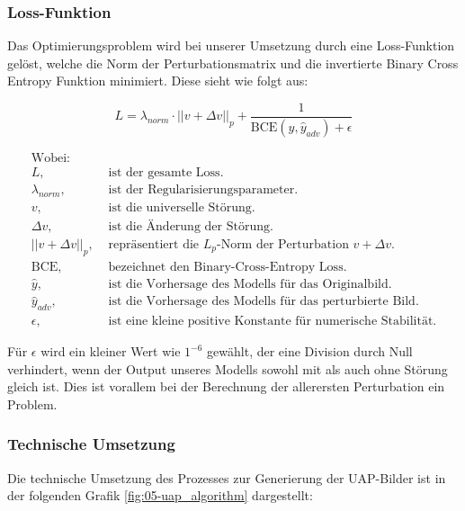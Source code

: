 \subsubsection{Loss-Funktion}
Das Optimierungsproblem wird bei unserer Umsetzung durch eine Loss-Funktion gelöst, welche die Norm der Perturbationsmatrix und die invertierte Binary Cross Entropy Funktion minimiert. Diese sieht wie folgt aus:

\begin{equation}
    L = \lambda_{norm} \cdot ||v + \Delta v||_p + \frac{1}{\text{BCE}(\hat{y}, \hat{y}_{adv}) + \epsilon}
\label{Loss}
\end{equation}

\begin{align*}
\text{Wobei:}&\\
L, &\text{ ist der gesamte Loss.} \\
\lambda_{norm}, &\text{ ist der Regularisierungsparameter.} \\
v, &\text{ ist die universelle Störung.} \\
\Delta v, &\text{ ist die Änderung der Störung.} \\
||v + \Delta v||_p, &\text{ repräsentiert die } L_p \text{-Norm der Perturbation } v + \Delta v. \\
\text{BCE}, &\text{ bezeichnet den Binary-Cross-Entropy Loss.} \\
\hat{y}, &\text{ ist die Vorhersage des Modells für das Originalbild.} \\
\hat{y}_{adv}, &\text{ ist die Vorhersage des Modells für das perturbierte Bild.} \\
\epsilon, &\text{ ist eine kleine positive Konstante für numerische Stabilität.}
\end{align*}


Für $\epsilon$ wird ein kleiner Wert wie $1^{-6}$ gewählt, der eine Division durch Null verhindert, wenn der Output unseres Modells sowohl mit als auch ohne Störung gleich ist. Dies ist vorallem bei der Berechnung der allerersten Perturbation ein Problem.

\newpage
\subsubsection{Technische Umsetzung}
Die technische Umsetzung des Prozesses zur Generierung der UAP-Bilder ist in der folgenden Grafik \ref{fig:05-uap_algorithm} dargestellt:

